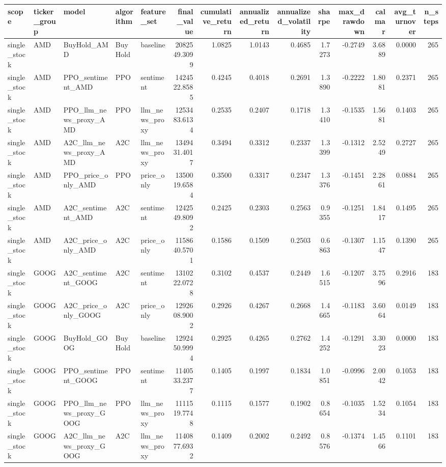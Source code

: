 \begin{tabular}{lllllrrrrrrrrr}
\toprule
scope & ticker_group & model & algorithm & feature_set & final_value & cumulative_return & annualized_return & annualized_volatility & sharpe & max_drawdown & calmar & avg_turnover & n_steps \\
\midrule
single_stock & AMD & BuyHold_AMD & BuyHold & baseline & 2082549.3099 & 1.0825 & 1.0143 & 0.4685 & 1.7273 & -0.2749 & 3.6889 & 0.0000 & 265 \\
single_stock & AMD & PPO_sentiment_AMD & PPO & sentiment & 1424522.8585 & 0.4245 & 0.4018 & 0.2691 & 1.3890 & -0.2222 & 1.8081 & 0.2371 & 265 \\
single_stock & AMD & PPO_llm_news_proxy_AMD & PPO & llm_news_proxy & 1253483.6134 & 0.2535 & 0.2407 & 0.1718 & 1.3410 & -0.1535 & 1.5681 & 0.1403 & 265 \\
single_stock & AMD & A2C_llm_news_proxy_AMD & A2C & llm_news_proxy & 1349431.4017 & 0.3494 & 0.3312 & 0.2337 & 1.3399 & -0.1312 & 2.5249 & 0.2727 & 265 \\
single_stock & AMD & PPO_price_only_AMD & PPO & price_only & 1350019.6584 & 0.3500 & 0.3317 & 0.2347 & 1.3376 & -0.1451 & 2.2861 & 0.0884 & 265 \\
single_stock & AMD & A2C_sentiment_AMD & A2C & sentiment & 1242549.8092 & 0.2425 & 0.2303 & 0.2563 & 0.9355 & -0.1251 & 1.8417 & 0.1495 & 265 \\
single_stock & AMD & A2C_price_only_AMD & A2C & price_only & 1158640.5701 & 0.1586 & 0.1509 & 0.2503 & 0.6863 & -0.1307 & 1.1547 & 0.1390 & 265 \\
single_stock & GOOG & A2C_sentiment_GOOG & A2C & sentiment & 1310222.0728 & 0.3102 & 0.4537 & 0.2449 & 1.6515 & -0.1207 & 3.7596 & 0.2916 & 183 \\
single_stock & GOOG & A2C_price_only_GOOG & A2C & price_only & 1292608.9002 & 0.2926 & 0.4267 & 0.2668 & 1.4665 & -0.1183 & 3.6064 & 0.0149 & 183 \\
single_stock & GOOG & BuyHold_GOOG & BuyHold & baseline & 1292450.9994 & 0.2925 & 0.4265 & 0.2762 & 1.4252 & -0.1291 & 3.3023 & 0.0000 & 183 \\
single_stock & GOOG & PPO_sentiment_GOOG & PPO & sentiment & 1140533.2377 & 0.1405 & 0.1997 & 0.1834 & 1.0851 & -0.0996 & 2.0042 & 0.1053 & 183 \\
single_stock & GOOG & PPO_llm_news_proxy_GOOG & PPO & llm_news_proxy & 1111519.7748 & 0.1115 & 0.1577 & 0.1902 & 0.8654 & -0.1035 & 1.5234 & 0.1054 & 183 \\
single_stock & GOOG & A2C_llm_news_proxy_GOOG & A2C & llm_news_proxy & 1140877.6932 & 0.1409 & 0.2002 & 0.2492 & 0.8576 & -0.1374 & 1.4566 & 0.1101 & 183 \\

\end{tabular}
